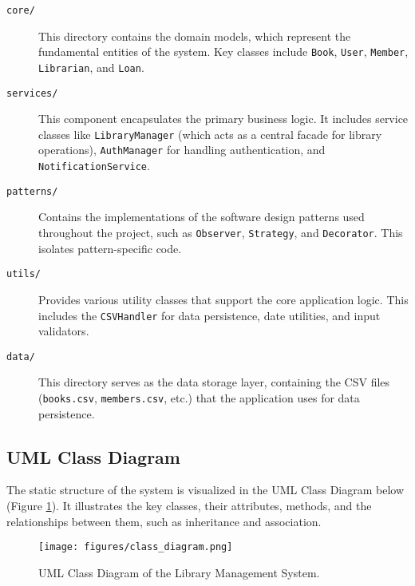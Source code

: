 \begin{description}
    \item[\texttt{core/}] This directory contains the domain models, which represent the fundamental entities of the system. Key classes include \texttt{Book}, \texttt{User}, \texttt{Member}, \texttt{Librarian}, and \texttt{Loan}.
    \item[\texttt{services/}] This component encapsulates the primary business logic. It includes service classes like \texttt{LibraryManager} (which acts as a central facade for library operations), \texttt{AuthManager} for handling authentication, and \texttt{NotificationService}.
    \item[\texttt{patterns/}] Contains the implementations of the software design patterns used throughout the project, such as \texttt{Observer}, \texttt{Strategy}, and \texttt{Decorator}. This isolates pattern-specific code.
    \item[\texttt{utils/}] Provides various utility classes that support the core application logic. This includes the \texttt{CSVHandler} for data persistence, date utilities, and input validators.
    \item[\texttt{data/}] This directory serves as the data storage layer, containing the CSV files (\texttt{books.csv}, \texttt{members.csv}, etc.) that the application uses for data persistence.
\end{description}

\subsection{UML Class Diagram}
The static structure of the system is visualized in the UML Class Diagram below \cite{Booch2007} (Figure \ref{fig:class_diagram}). It illustrates the key classes, their attributes, methods, and the relationships between them, such as inheritance and association.

\begin{figure}[H]
    \centering
    \texttt{[image: figures/class\_diagram.png]}
    \caption{UML Class Diagram of the Library Management System.}
    \label{fig:class_diagram}
\end{figure}